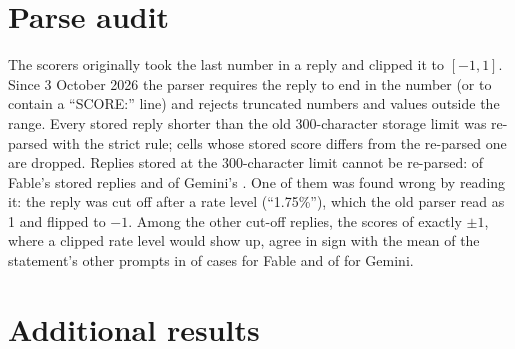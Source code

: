 \FloatBarrier
\section{Parse audit}\label{app:parse}

The scorers originally took the last number in a reply and clipped it to $[-1,1]$. Since 3 October 2026
the parser requires the reply to end in the number (or to contain a ``SCORE:'' line) and rejects
truncated numbers and values outside the range. Every stored reply shorter than the old 300-character
storage limit was re-parsed with the strict rule; cells whose stored score differs from the re-parsed
one are dropped. Replies stored at the 300-character limit cannot be re-parsed:  of
Fable's  stored replies and  of Gemini's . One of them
was found wrong by reading it: the reply was cut off after a rate level (``1.75\%''), which the old parser
read as 1 and flipped to $-1$. Among the other cut-off replies, the scores of exactly $\pm1$, where a
clipped rate level would show up, agree in sign with the mean of the statement's other prompts in
 of  cases for Fable and  of
 for Gemini.

\begin{table}[H]
\centering
\caption{Cells dropped by the parse audit}\label{tab:parse}
\footnotesize
\setlength{\tabcolsep}{4pt}

\end{table}

\FloatBarrier
\section{Additional results}\label{app:more}

\begin{table}[h]
\centering
\caption{Daily yields on MPS, with and without dScore}\label{tab:beyond}
\footnotesize

\end{table}

\begin{table}[h]
\centering
\caption{Clean minus blinded or paraphrased slopes, hold meetings}\label{tab:gaps}
\small

\end{table}

